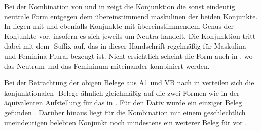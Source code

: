 Bei der Kombination von   und 
 in  zeigt die Konjunktion die sonst
eindeutig neutrale Form entgegen dem übereinstimmend maskulinen  der
beiden Konjunkte. In  liegen mit 
 und   ebenfalls Konjunkte mit
übereinstimmendem Genus der Konjunkte vor, insofern es sich jeweils um Neutra
handelt. Die Konjunktion tritt dabei mit dem -Suffix auf, das in dieser
Handschrift regelmäßig für Maskulina und Feminina Plural bezeugt ist. Nicht
ersichtlich scheint die Form  auch in ,
wo das Neutrum   und das Femininum 
 miteinander kombiniert werden.

Bei der Betrachtung der obigen Belege aus A1 und VB nach
 in  verteilen sich die
konjunktionalen -Belege ähnlich gleichmäßig auf die zwei Formen wie
in der äquivalenten Aufstellung für das \CAO{} in
. Für den Dativ wurde ein einziger Beleg
gefunden . Darüber hinaus liegt für die Kombination mit einem
geschlechtlich uneindeutigen belebten Konjunkt noch
mindestens ein weiterer Beleg für  vor .

